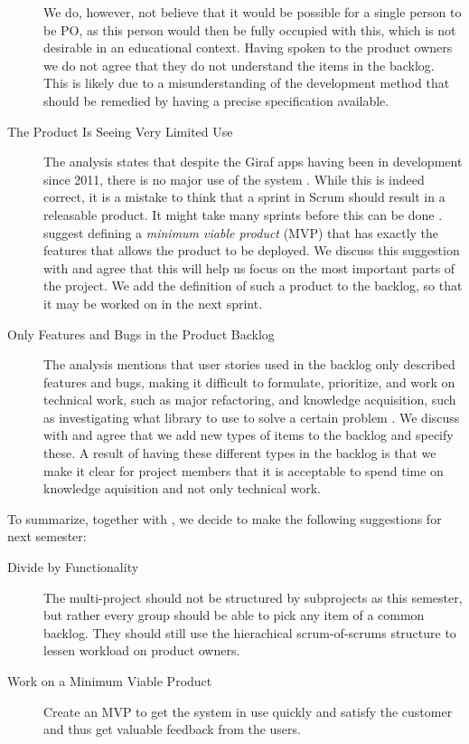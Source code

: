 \begin{description}
We do, however, not believe that it would be possible for a single person to be PO, as this person would then be fully occupied with this, which is not desirable in an educational context. Having spoken to the product owners we do not agree that they do not understand the items in the backlog. This is likely due to a misunderstanding of the development method that should be remedied by having a precise specification available.
  \item[The Product Is Seeing Very Limited Use] The analysis states that despite the Giraf apps having been in development since 2011, there is no major use of the system \cite{processanalysis}. While this is indeed correct, it is a mistake to think that a sprint in Scrum should result in a releasable product. It might take many sprints before this can be done \parencite{larman2003}.  suggest defining a \emph{minimum viable product} (MVP) that has exactly the features that allows the product to be deployed. We discuss this suggestion with  and agree that this will help us focus on the most important parts of the project. We add the definition of such a product to the backlog, so that it may be worked on in the next sprint.
  \item[Only Features and Bugs in the Product Backlog] The analysis mentions that user stories used in the backlog only described features and bugs, making it difficult to formulate, prioritize, and work on technical work, such as major refactoring, and knowledge acquisition, such as investigating what library to use to solve a certain problem \cite{processanalysis}. We discuss with  and agree that we add new types of items to the backlog and specify these. A result of having these different types in the backlog is that we make it clear for project members that it is acceptable to spend time on knowledge aquisition and not only technical work.
\end{description}

To summarize, together with , we decide to make the following suggestions for next semester:

\begin{description}
  \item[Divide by Functionality] The multi-project should not be structured by subprojects as this semester, but rather every group should be able to pick any item of a common backlog. They should still use the hierachical scrum-of-scrums structure to lessen workload on product owners.
  \item[Work on a Minimum Viable Product] Create an MVP to get the system in use quickly and satisfy the customer and thus get valuable feedback from the users.
\end{description}

